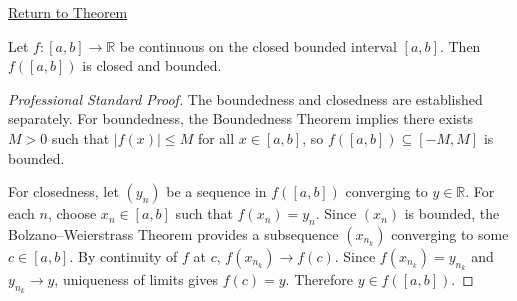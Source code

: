 \newpage
{}
\label{prf:image-of-function-on-closed-bounded-interval-is-closed-bounded}

\begin{remark*}[Return]
\hyperref[thm:image-of-function-on-closed-bounded-interval-is-closed-bounded]{Return to Theorem}
\end{remark*}

\begin{theorem*}
Let $f \colon [a,b] \to \mathbb{R}$ be continuous on the closed bounded interval $[a,b]$. Then $f([a,b])$ is closed and bounded.
\end{theorem*}

\begin{proof}[Professional Standard Proof]
\LRAProofBodyStart
The boundedness and closedness are established separately. For boundedness, the Boundedness Theorem implies there exists $M > 0$ such that $|f(x)| \leq M$ for all $x \in [a,b]$, so $f([a,b]) \subseteq [-M, M]$ is bounded.

For closedness, let $(y_n)$ be a sequence in $f([a,b])$ converging to $y \in \mathbb{R}$. For each $n$, choose $x_n \in [a,b]$ such that $f(x_n) = y_n$. Since $(x_n)$ is bounded, the Bolzano--Weierstrass Theorem provides a subsequence $(x_{n_k})$ converging to some $c \in [a,b]$. By continuity of $f$ at $c$, $f(x_{n_k}) \to f(c)$. Since $f(x_{n_k}) = y_{n_k}$ and $y_{n_k} \to y$, uniqueness of limits gives $f(c) = y$. Therefore $y \in f([a,b])$.
\end{proof}

